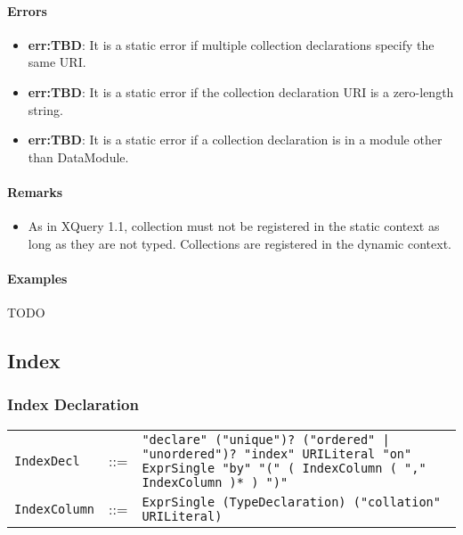 \documentclass[]{article}
\begin{document}
\vspace{0.5cm}

\paragraph{Errors}
\begin{itemize}
  \item \textbf{err:TBD}: It is a static error if multiple collection declarations specify the same URI.
  \item \textbf{err:TBD}: It is a static error if the collection declaration URI is a zero-length string.
  \item \textbf{err:TBD}: It is a static error if a collection declaration is in a module other than DataModule.
\end{itemize}

\paragraph{Remarks}
\begin{itemize}
  \item As in XQuery 1.1, collection must not be registered in the static context as long as they are not typed. Collections are registered in the dynamic context.
\end{itemize}

\paragraph{Examples}
TODO

\subsection{Index}
\subsubsection{Index Declaration}
\begin{tabular}{l c p{12cm}}
{\tt IndexDecl}   & ::= & {\tt "declare" ("unique")? ("ordered" | "unordered")? "index" URILiteral "on" ExprSingle "by" "(" ( IndexColumn ( "," IndexColumn )* ) ")"} \\
{\tt IndexColumn} & ::= & {\tt ExprSingle (TypeDeclaration) ("collation" URILiteral)}
\end{tabular}
\end{document}
